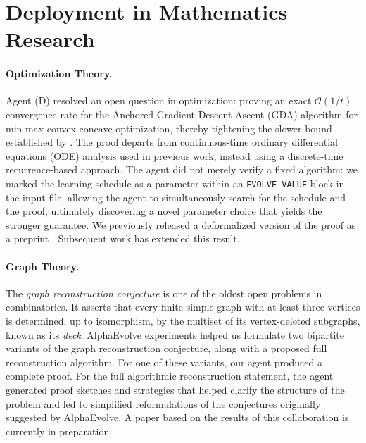\section{Deployment in Mathematics Research}

\paragraph{Optimization Theory.} Agent (D) resolved an open question in optimization: proving an exact $\mathcal{O}(1/t)$ convergence rate for the Anchored Gradient Descent-Ascent (GDA) algorithm for min-max convex-concave optimization, thereby tightening the slower bound established by \cite{ryu2019ode}. 
The proof departs from continuous-time ordinary differential equations (ODE) analysis used in previous work, instead using a discrete-time recurrence-based approach. The agent did not merely verify a fixed algorithm: we marked the learning schedule as a parameter within an \texttt{EVOLVE-VALUE} block in the input file, allowing the agent to simultaneously search for the schedule and the proof, ultimately discovering a novel parameter choice that yields the stronger guarantee. We previously released a deformalized version of the proof as a preprint \cite{surina2026improvedlastiterateconvergencerate}. %
Subsequent work \cite{cai2026last} has extended this result.

\paragraph{Graph Theory.} The \emph{graph reconstruction conjecture}
\cite{graphreconstruction} is one of the oldest open problems in combinatorics.
It asserts that every finite simple graph with at least three vertices is
determined, up to isomorphism, by the multiset of its vertex-deleted subgraphs,
known as its \emph{deck}.  AlphaEvolve \cite{novikov2025alphaevolve} experiments helped us 
formulate two bipartite variants of the graph reconstruction conjecture, along
with a proposed full reconstruction algorithm.  For
one of these variants, our agent produced a complete proof.  For the full
algorithmic reconstruction statement, the agent generated proof sketches and
strategies that helped clarify the structure of the problem and led to
simplified reformulations of the conjectures originally suggested by
AlphaEvolve.  A paper based on the results of this collaboration is currently
in preparation.

